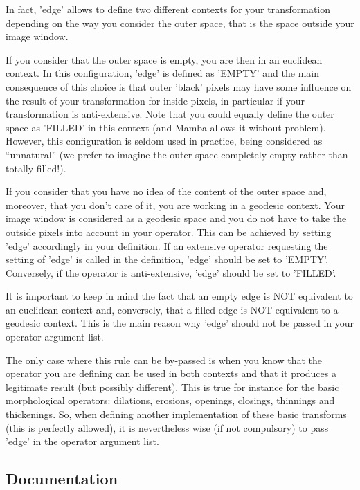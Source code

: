 \documentclass[a4paper,10pt,oneside]{article}
\begin{document}
In fact, 'edge' allows to define two different contexts for your transformation 
depending on the way you consider the outer space, that is the space outside 
your image window.

If you consider that the outer space is empty, you are then in an euclidean 
context. In this configuration, 'edge' is defined as 'EMPTY' and the main 
consequence of this choice is that outer 'black' pixels may have some influence 
on the result of your transformation for inside pixels, in particular if your 
transformation is anti-extensive. Note that you could equally define the outer 
space as 'FILLED' in this context (and Mamba allows it without problem). 
However, this configuration is seldom used in practice, being considered as 
``unnatural'' (we prefer to imagine the outer space completely empty rather 
than totally filled!).

If you consider that you have no idea of the content of the outer space and, 
moreover, that you don't care of it, you are working in a geodesic context. 
Your image window is considered as a geodesic space and you do not have to take 
the outside pixels into account in your operator. This can be achieved by 
setting 'edge' accordingly in your definition. If  an extensive operator 
requesting the setting of 'edge' is called in the definition, 'edge' should be 
set to 'EMPTY'. Conversely, if the operator is anti-extensive, 'edge' should be 
set to 'FILLED'.

It is important to keep in mind the fact that an empty edge is NOT equivalent 
to an euclidean context and, conversely, that a filled edge is NOT equivalent 
to a geodesic context. This is the main reason why 'edge' should not be passed 
in your operator argument list.

The only case where this rule can be by-passed is when you know that the 
operator you are defining can be used in both contexts and that it produces a 
legitimate result (but possibly different). This is true for instance for the 
basic morphological operators: dilations, erosions, openings, closings, 
thinnings and thickenings. So, when defining another implementation of these 
basic transforms (this is perfectly allowed), it is nevertheless wise (if not 
compulsory) to pass 'edge' in the operator argument list.

\subsection{Documentation}
\end{document}
